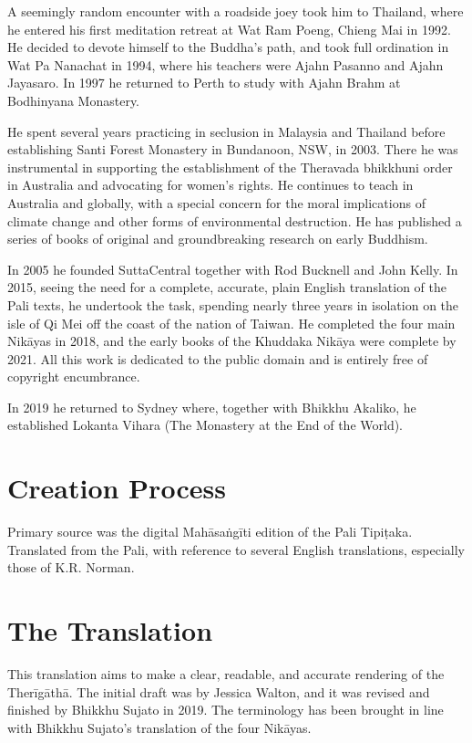 \documentclass[12pt,openany]{book}%
\begin{document}
A seemingly random encounter with a roadside joey took him to Thailand, where he entered his first meditation retreat at Wat Ram Poeng, Chieng Mai in 1992. He decided to devote himself to the Buddha’s path, and took full ordination in Wat Pa Nanachat in 1994, where his teachers were Ajahn Pasanno and Ajahn Jayasaro. In 1997 he returned to Perth to study with Ajahn Brahm at Bodhinyana Monastery. 

He spent several years practicing in seclusion in Malaysia and Thailand before establishing Santi Forest Monastery in Bundanoon, NSW, in 2003. There he was instrumental in supporting the establishment of the Theravada bhikkhuni order in Australia and advocating for women’s rights. He continues to teach in Australia and globally, with a special concern for the moral implications of climate change and other forms of environmental destruction. He has published a series of books of original and groundbreaking research on early Buddhism. 

In 2005 he founded SuttaCentral together with Rod Bucknell and John Kelly. In 2015, seeing the need for a complete, accurate, plain English translation of the Pali texts, he undertook the task, spending nearly three years in isolation on the isle of Qi Mei off the coast of the nation of Taiwan. He completed the four main \textsanskrit{Nikāyas} in 2018, and the early books of the Khuddaka \textsanskrit{Nikāya} were complete by 2021. All this work is dedicated to the public domain and is entirely free of copyright encumbrance. 

In 2019 he returned to Sydney where, together with Bhikkhu Akaliko, he established Lokanta Vihara (The Monastery at the End of the World). 

\section*{Creation Process}

Primary source was the digital \textsanskrit{Mahāsaṅgīti} edition of the Pali \textsanskrit{Tipiṭaka}. Translated from the Pali, with reference to several English translations, especially those of K.R. Norman.

\section*{The Translation}

This translation aims to make a clear, readable, and accurate rendering of the \textsanskrit{Therīgāthā}. The initial draft was by Jessica Walton, and it was revised and finished by Bhikkhu Sujato in 2019. The terminology has been brought in line with Bhikkhu Sujato’s translation of the four \textsanskrit{Nikāyas}.
\end{document}
